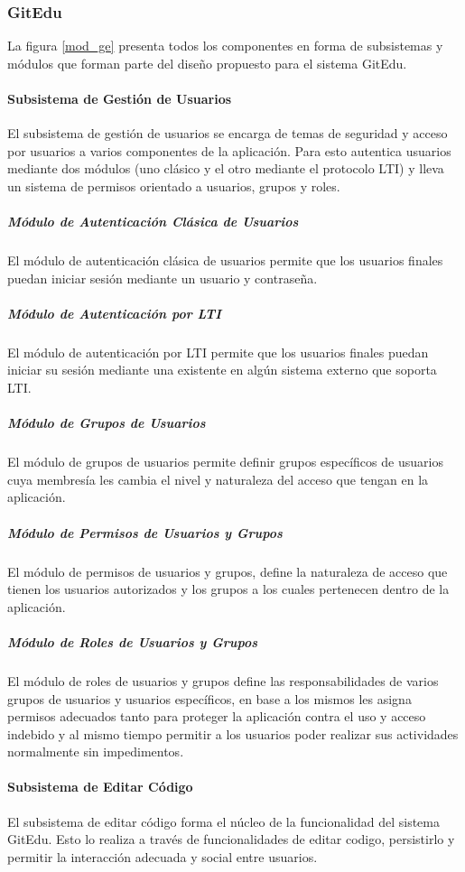\subsubsection{GitEdu}

La figura \ref{mod_ge} presenta todos los componentes en forma de subsistemas y módulos que forman parte del diseño propuesto para el sistema GitEdu.

\paragraph{Subsistema de Gestión de Usuarios}
El subsistema de gestión de usuarios se encarga de temas de seguridad y acceso por usuarios a varios componentes de la aplicación. Para esto autentica usuarios mediante dos módulos (uno clásico y el otro mediante el protocolo LTI) y lleva un sistema de permisos orientado a usuarios, grupos y roles.

\subparagraph{Módulo de Autenticación Clásica de Usuarios}
El módulo de autenticación clásica de usuarios permite que los usuarios finales puedan iniciar sesión mediante un usuario y contraseña.

\subparagraph{Módulo de Autenticación por LTI}
El módulo de autenticación por LTI  permite que los usuarios finales puedan iniciar su sesión mediante una existente en algún sistema externo que soporta LTI.

\subparagraph{Módulo de Grupos de Usuarios}
El módulo de grupos de usuarios permite definir grupos específicos de usuarios cuya membresía les cambia el nivel y naturaleza del acceso que tengan en la aplicación.

\subparagraph{Módulo de Permisos de Usuarios y Grupos}
El módulo de permisos de usuarios y grupos, define la naturaleza de acceso que tienen los usuarios autorizados y los grupos a los cuales pertenecen dentro de la aplicación.

\subparagraph{Módulo de Roles de Usuarios y Grupos}
El módulo de roles de usuarios y grupos define las responsabilidades de varios grupos de usuarios y usuarios específicos, en base a los mismos les asigna permisos adecuados tanto para proteger la aplicación contra el uso y acceso indebido y al mismo tiempo permitir a los usuarios poder realizar sus actividades normalmente sin impedimentos.

\paragraph{Subsistema de Editar Código}
El subsistema de editar código forma el núcleo de la funcionalidad del sistema GitEdu. Esto lo realiza a través de funcionalidades de editar codigo, persistirlo y permitir la interacción adecuada y social entre usuarios.

